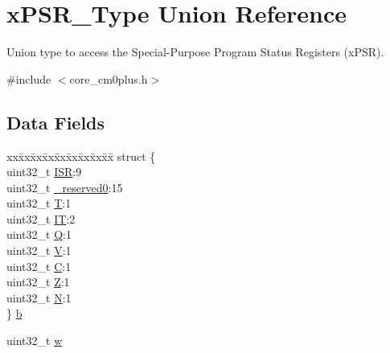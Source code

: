 \hypertarget{unionx_p_s_r___type}{}\section{x\+P\+S\+R\+\_\+\+Type Union Reference}
\label{unionx_p_s_r___type}


Union type to access the Special-\/\+Purpose Program Status Registers (x\+P\+SR).  




{\ttfamily \#include $<$core\+\_\+cm0plus.\+h$>$}

\subsection*{Data Fields}
\begin{DoxyCompactItemize}
\item 
\begin{tabbing}
xx\=xx\=xx\=xx\=xx\=xx\=xx\=xx\=xx\=\kill
struct \{\\
\>uint32\_t \mbox{\hyperlink{unionx_p_s_r___type_ad502ba7dbb2aab5f87c782b28f02622d}{ISR}}:9\\
\>uint32\_t \mbox{\hyperlink{unionx_p_s_r___type_ac8a6a13838a897c8d0b8bc991bbaf7c1}{\_reserved0}}:15\\
\>uint32\_t \mbox{\hyperlink{unionx_p_s_r___type_a6e1cf12e53a20224f6f62c001d9be972}{T}}:1\\
\>uint32\_t \mbox{\hyperlink{unionx_p_s_r___type_a76485660fe8ad98cdc71ddd7cb0ed777}{IT}}:2\\
\>uint32\_t \mbox{\hyperlink{unionx_p_s_r___type_a65f27ddc4f7e09c14ce7c5211b2e000a}{Q}}:1\\
\>uint32\_t \mbox{\hyperlink{unionx_p_s_r___type_acd4a2b64faee91e4a9eef300667fa222}{V}}:1\\
\>uint32\_t \mbox{\hyperlink{unionx_p_s_r___type_a7a1caf92f32fe9ebd8d1fe89b06c7776}{C}}:1\\
\>uint32\_t \mbox{\hyperlink{unionx_p_s_r___type_a5ae954cbd9986cd64625d7fa00943c8e}{Z}}:1\\
\>uint32\_t \mbox{\hyperlink{unionx_p_s_r___type_abae0610bc2a97bbf7f689e953e0b451f}{N}}:1\\
\} \mbox{\hyperlink{unionx_p_s_r___type_ab57daf12b15d905939ef81da6537919b}{b}}\\

\end{tabbing}\item 
uint32\+\_\+t \mbox{\hyperlink{unionx_p_s_r___type_ad0fb62e7a08e70fc5e0a76b67809f84b}{w}}
\end{DoxyCompactItemize}


